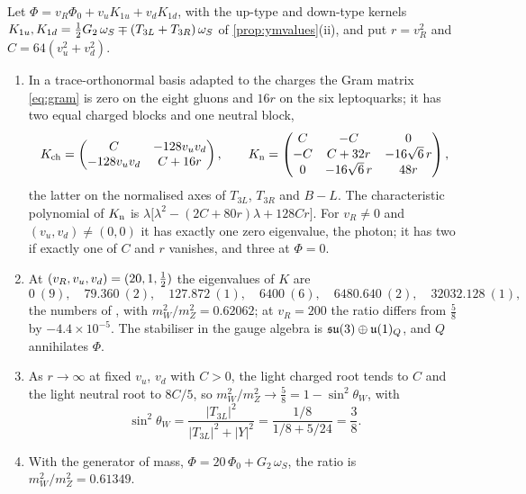 \begin{theorem}
\label{thm:vectors}
Let $\Phi=v_R\Phi_0+v_uK_{1u}+v_dK_{1d}$, with the up-type and down-type kernels
$K_{1u},K_{1d}=\tfrac12 G_2\,\omega_S\mp(T_{3L}+T_{3R})\,\omega_S$ of \cref{prop:ymvalues}(ii), and put $r=v_R^2$ and $C=64(v_u^2+v_d^2)$.
\begin{enumerate}[label=(\roman*),leftmargin=2.2em,itemsep=1pt]
\item In a trace-orthonormal basis adapted to the charges the Gram matrix \cref{eq:gram} is zero on the eight gluons and $16r$ on the six
leptoquarks; it has two equal charged blocks and one neutral block,
\[
K_{\rm ch}=\begin{pmatrix}C&-128v_uv_d\\-128v_uv_d&C+16r\end{pmatrix},\qquad
K_{\rm n}=\begin{pmatrix}C&-C&0\\-C&C+32r&-16\sqrt6\,r\\0&-16\sqrt6\,r&48r\end{pmatrix},
\]
the latter on the normalised axes of $T_{3L}$, $T_{3R}$ and $B\!-\!L$. The characteristic polynomial of $K_{\rm n}$ is
$\lambda\bigl[\lambda^2-(2C+80r)\lambda+128Cr\bigr]$. For $v_R\ne0$ and $(v_u,v_d)\ne(0,0)$ it has exactly one zero eigenvalue, the photon;
it has two if exactly one of $C$ and $r$ vanishes, and three at $\Phi=0$.
\item At $(v_R,v_u,v_d)=(20,1,\tfrac12)$ the eigenvalues of $K$ are
\[
0\ (9),\quad 79.360\ (2),\quad 127.872\ (1),\quad 6400\ (6),\quad 6480.640\ (2),\quad 32032.128\ (1),
\]
the numbers of , with $m_W^2/m_Z^2=0.62062$; at $v_R=200$ the ratio differs from $\tfrac58$ by $-4.4\times10^{-5}$. The
stabiliser in the gauge algebra is $\mathfrak{su}(3)\oplus\mathfrak{u}(1)_Q$, and $Q$ annihilates $\Phi$.
\item As $r\to\infty$ at fixed $v_u$, $v_d$ with $C>0$, the light charged root tends to $C$ and the light neutral root to $8C/5$, so $m_W^2/m_Z^2\to\tfrac58=1-\sin^2\theta_W$,
with
\[
\sin^2\theta_W=\frac{|T_{3L}|^2}{|T_{3L}|^2+|Y|^2}=\frac{1/8}{1/8+5/24}=\frac38 .
\]
\item With the generator of mass, $\Phi=20\,\Phi_0+G_2\,\omega_S$, the ratio is $m_W^2/m_Z^2=0.61349$.
\end{enumerate}
\end{theorem}

